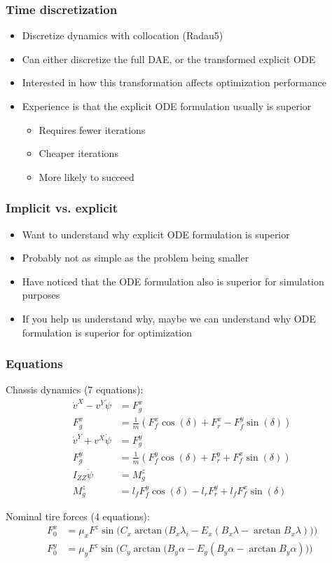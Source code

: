 \documentclass[]{beamer}
\begin{document}
\begin{frame}
\frametitle{Time discretization}
\begin{itemize}
\item
Discretize dynamics with collocation (Radau5)
\item
Can either discretize the full DAE, or the transformed explicit ODE
\item
Interested in how this transformation affects optimization performance
\item
Experience is that the explicit ODE formulation usually is superior
\begin{itemize}
\item
Requires fewer iterations
\item
Cheaper iterations
\item
More likely to succeed
\end{itemize}
\end{itemize}
\end{frame}

\begin{frame}
\frametitle{Implicit vs. explicit}
\begin{itemize}
\item
Want to understand why explicit ODE formulation is superior
\item
Probably not as simple as the problem being smaller
\item
Have noticed that the ODE formulation also is superior for simulation purposes
\item
If you help us understand why, maybe we can understand why ODE formulation is superior for optimization
\end{itemize}
\end{frame}

\begin{frame}
\frametitle{Equations}
{\small
Chassis dynamics (7 equations):
\begin{align}
\dot{v}^X - v^Y \dot{\psi}  &= F_g^x \\
F_g^x &= \frac{1}{m} ( F^x_{f}\cos(\delta) + F^x_{r} -F^y_{f}\sin(\delta) ) \\
\dot{v}^Y + v^X \dot{\psi}  &= F_g^y \\
F_g^y &= \frac{1}{m} ( F^y_{f}\cos(\delta) +
F^y_{r} +F^x_{f}\sin(\delta) ) \\
I_{ZZ} \ddot{\psi} &= M_g^z \\
M_g^z &= l_f F^y_{f}\cos(\delta) - l_r F^y_{r} + l_fF^x_{f}\sin(\delta)
\end{align}

Nominal tire forces (4 equations):
	\begin{align}
		F^x_{0} &= \mu_x F^z 
		\sin\Big( C_{x} 
		\arctan\big(B_{x} \lambda_i -E_{x}(B_{x}\lambda-\arctan B_{x}\lambda)\big)\Big)
		\\ 
		F^y_{0} &= \mu_y F^z \sin\Big( C_{y} \arctan\big(B_{y} \alpha -E_{y}(B_{y}\alpha-\arctan B_{y}\alpha)\big)\Big)
	\end{align}
}
\end{frame}
\end{document}
